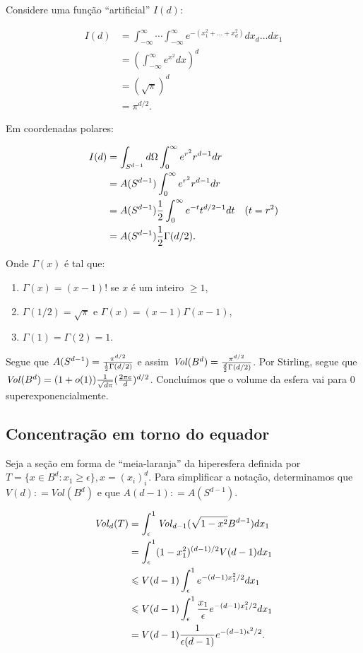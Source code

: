 Considere uma função “artificial” $I(d)$:

\begin{align*}
  I(d)&= \int_{-\infty}^{\infty} \cdots \int_{-\infty}^{\infty} e^{-(x_1^2 + \dots + x_d^2)} dx_d \dots dx_1 \\
      &= (\int_{-\infty}^{\infty} e^{x^2}dx)^d \\
      &= (\sqrt{\pi})^d \\
      &= \pi^{d/2}.
\end{align*}

Em coordenadas polares:

\begin{align*}
  I(d)&= \int_{S^{d-1}} d\Omega \int_0^\infty e^{r^2} r^{d-1} dr \\
      &= A(S^{d-1}) \int_0^\infty e^{r^2} r^{d-1} dr \\
      &= A(S^{d-1}) {1\over 2} \int_0^\infty e^{-t} t^{d/2 - 1} dt & (t = r^2)\\
      &= A(S^{d-1}) {1\over 2} \Gamma (d/2).
\end{align*}

Onde $\Gamma(x)$ é tal que:

\begin{enumerate}
\item $\Gamma(x) = (x-1)!$ se $x$ é um inteiro $\geqslant 1$,
\item $\Gamma(1/2) = \sqrt{\pi}$ e $\Gamma(x) = (x-1)\Gamma(x-1)$,
\item $\Gamma(1) = \Gamma(2) = 1$.
\end{enumerate}

Segue que $A(S^{d-1}) = {\pi^{d/2} \over {1\over 2} \Gamma (d/2)}$ e assim $\mathit{Vol}(B^d) = {\pi^{d/2} \over {d\over 2} \Gamma (d/2)}$. Por Stirling, segue que $\mathit{Vol}(B^d) = (1 + o(1)) {1 \over \sqrt{d\pi}} ({2 \pi e \over d})^{d/2}$. Concluímos que o volume da esfera vai para 0 superexponencialmente.

\subsection{Concentração em torno do equador}

Seja a seção em forma de “meia-laranja” da hiperesfera definida por $T = \{x \in B^d: x_1 \geqslant \epsilon\}, x = (x_i)_i^d$. Para simplificar a notação, determinamos que $V(d)\colon = \mathit{Vol}(B^d)$ e que $A(d-1)\colon = A(S^{d-1})$.

\begin{align*}
  \mathit{Vol}_d(T) &= \int_\epsilon^1 \mathit{Vol}_{d-1}(\sqrt{1-x^2}B^{d-1}) dx_1 \\
      &= \int_\epsilon^1 (1-x_1^2)^{(d-1)/2} V(d-1) dx_1 \\
      &\leqslant V(d-1) \int_\epsilon^1 e^{-(d-1)x_1^2/2} dx_1 \\
      &\leqslant V(d-1) \int_\epsilon^1 {x_1 \over \epsilon} e^{-(d-1)x_1^2/2} dx_1 \\
      &= V(d-1) {1\over \epsilon(d-1)} e^{-(d-1)\epsilon^2/2}.
\end{align*}

